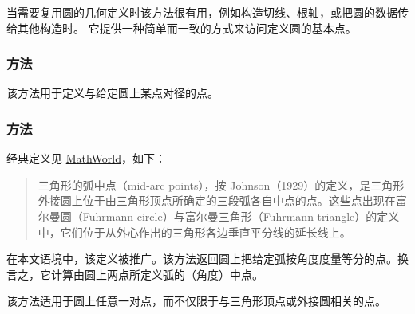 当需要复用圆的几何定义时该方法很有用，例如构造切线、根轴，或把圆的数据传给其他构造时。
它提供一种简单而一致的方式来访问定义圆的基本点。



\subsubsection{方法 }
\label{ssub:method_circle_antipode}
该方法用于定义与给定圆上某点对径的点。

\vspace{1em}
\begin{tkzexample}[latex=.5\textwidth]
\begin{center}
\end{center}
\end{tkzexample}

\subsubsection{方法 }
\label{ssub:method_circle_midarc}

经典定义见 \href{https://mathworld.wolfram.com/Mid-ArcPoints.html}{MathWorld}，如下：

\medskip
\begin{quote}
三角形的弧中点（mid-arc points），按 Johnson（1929）的定义，是三角形外接圆上位于由三角形顶点所确定的三段弧各自中点的点。这些点出现在富尔曼圆（Fuhrmann circle）与富尔曼三角形（Fuhrmann triangle）的定义中，它们位于从外心作出的三角形各边垂直平分线的延长线上。
\end{quote}

\medskip

在本文语境中，该定义被推广。该方法返回圆上把给定弧按角度度量等分的点。换言之，它计算由圆上两点所定义弧的（角度）中点。

\medskip

该方法适用于圆上任意一对点，而不仅限于与三角形顶点或外接圆相关的点。

\vspace{1em}
\begin{tkzexample}[latex=.5\textwidth]
\begin{center}
  \end{center}
\end{tkzexample}

